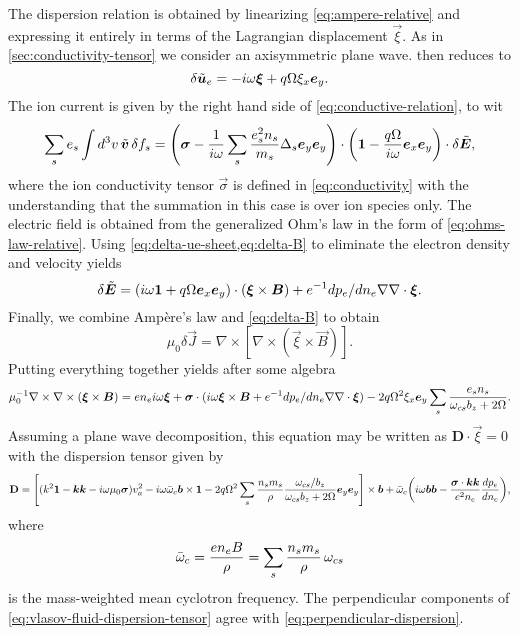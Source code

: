 \documentclass[aps,pre,notitlepage,amsmath,amssymb,amsfonts,nobibnotes,nofootinbib]{revtex4-1}
\begin{document}
The dispersion relation is obtained by linearizing \cref{eq:ampere-relative}
and expressing it entirely in terms of the Lagrangian displacement
$\vec{\xi}$. As in \cref{sec:conductivity-tensor} we consider an axisymmetric
plane wave.  then reduces to
\begin{equation}
  \label{eq:delta-ue-sheet}
  \delta\tvec{u}_e = -i\omega\vec{\xi} + q\Omega\xi_x\ey.
\end{equation}
The ion current is given by the right hand side of
\cref{eq:conductive-relation}, to wit
\begin{equation}
  \sums \qs\int d^3v\,\tvec{v}\,\delta f_s
  = \left(
    \vec{\sigma} - \frac{1}{i\omega}\sums\frac{\qs^2 n_s}{m_s}\Delta_s\ey\ey
  \right)\cdot\left(\mathbf{1} - \frac{q\Omega}{i\omega}\ex\ey\right)
  \cdot\delta\tvec{E},
\end{equation}
where the ion conductivity tensor $\vec{\sigma}$ is defined in
\cref{eq:conductivity} with the understanding that the summation in this case
is over ion species only. The electric field is obtained from the generalized
Ohm's law in the form of \cref{eq:ohms-law-relative}. Using
\cref{eq:delta-ue-sheet,eq:delta-B} to eliminate the electron density and
velocity yields
\begin{equation}
  \label{eq:ohm-linear-sheet}
  \delta\tvec{E}
  = (i\omega\mathbf{1} + q\Omega\ex\ey)\cdot(\vec{\xi}\times\vec{B})
  + e^{-1}d\pe/dn_e\nabla\nabla\cdot\vec{\xi}.
\end{equation}
Finally, we combine Ampère's law and \cref{eq:delta-B} to obtain
\begin{equation}
  \mu_0\delta\vec{J} = \nabla\times[\nabla\times(\vec{\xi}\times\vec{B})].
\end{equation}
Putting everything together yields after some algebra
\begin{equation}
  \label{eq:ampere-xi}
  \mu_0^{-1}\nabla\times\nabla\times(\vec{\xi}\times\vec{B}) =
  en_e i\omega\vec{\xi} + \vec{\sigma}\cdot(i\omega\vec{\xi}\times\vec{B}
  + e^{-1}d\pe/dn_e\nabla\nabla\cdot\vec{\xi})
  - 2q\Omega^2\xi_x\ey\sums\frac{\qs n_s}{\omega_{cs}b_z + 2\Omega}.
\end{equation}
Assuming a plane wave decomposition, this equation may be written as
$\mathbf{D}\cdot\vec{\xi}=0$ with the dispersion tensor given by
\begin{equation}
  \label{eq:vlasov-fluid-dispersion-tensor}
  \mathbf{D} =
  \left[
    (k^2\mathbf{1} - \vec{k}\vec{k} - i\omega\mu_0\vec{\sigma})\va^2
    - i\omega\ome\vec{b}\times\mathbf{1}
    - 2q\Omega^2\sums\frac{n_s m_s}{\rho}
    \frac{\omcs/b_z}{\omcs b_z + 2\Omega}\ey\ey
  \right]\times\vec{b}
  + \ome\left(
    i\omega\vec{b}\vec{b}
    - \frac{\vec{\sigma}\cdot\vec{k}\vec{k}}{e^2n_e}\der{\pe}{n_e}
  \right),
\end{equation}
where
\begin{equation}
  \bar{\omega}_c = \frac{en_e B}{\rho} = \sum_s\frac{n_s m_s}{\rho}\,\omega_{cs}
\end{equation}
is the mass-weighted mean cyclotron frequency. The perpendicular components of
\cref{eq:vlasov-fluid-dispersion-tensor} agree with
\cref{eq:perpendicular-dispersion}.


\end{document}
